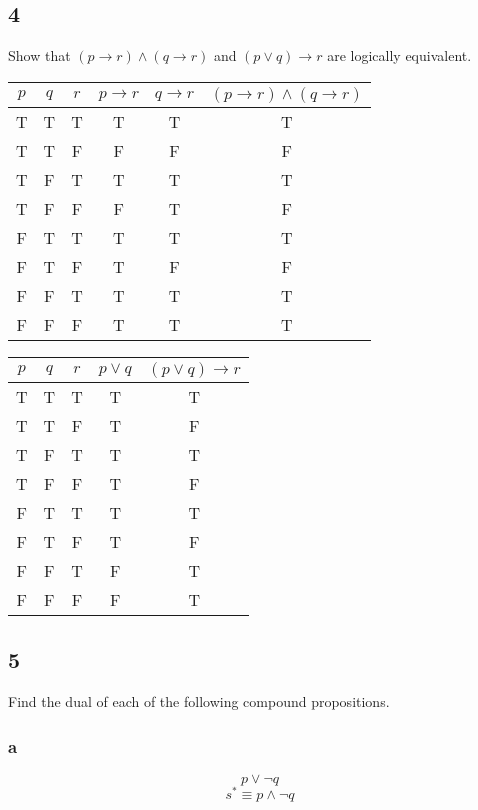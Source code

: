 \documentclass{math}
\begin{document}
\subsection*{4}
Show that \( (p \to r) \wedge (q \to r) \) and \( (p \vee q) \to r \) are
logically equivalent.
\begin{center}
  \begin{tabular}{|c|c|c|c|c|c|}
    \hline
    \( p \) & \( q \) & \( r \) & \( p \to r \) & \( q \to r \) &
    \( (p \to r) \wedge (q \to r) \) \\ \hline
    T & T & T & T & T & T \\ \hline
    T & T & F & F & F & F \\ \hline
    T & F & T & T & T & T \\ \hline
    T & F & F & F & T & F \\ \hline
    F & T & T & T & T & T \\ \hline
    F & T & F & T & F & F \\ \hline
    F & F & T & T & T & T \\ \hline
    F & F & F & T & T & T \\ \hline
  \end{tabular}
\end{center}
\begin{center}
  \begin{tabular}{|c|c|c|c|c|}
    \hline
    \( p \) & \( q \) & \( r \) & \( p \vee q \) & \( (p \vee q) \to r \)
        \\ \hline
    T & T & T & T & T \\ \hline
    T & T & F & T & F \\ \hline
    T & F & T & T & T \\ \hline
    T & F & F & T & F \\ \hline
    F & T & T & T & T \\ \hline
    F & T & F & T & F \\ \hline
    F & F & T & F & T \\ \hline
    F & F & F & F & T \\ \hline
  \end{tabular}
\end{center}

\subsection*{5}
Find the dual of each of the following compound propositions.

\subsubsection*{a}
\[ p \vee \neg{q} \]
\[ s^{*} \equiv p \wedge \neg{q} \]
\end{document}
